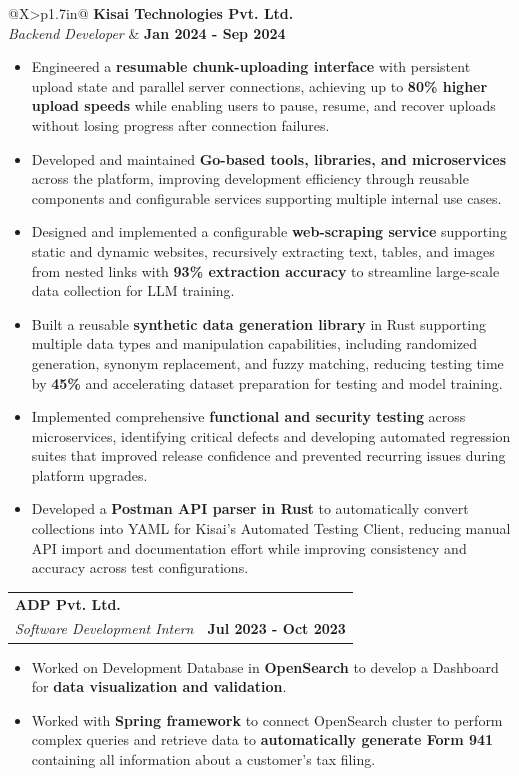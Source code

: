 \documentclass[8pt,a4paper]{article}
\makeatletter
\newcommand{\job}[2]{%
  \vspace{1pt}
  \begin{tabularx}{\linewidth}{@{}X>{\raggedleft\arraybackslash}p{1.7in}@{}}
    #1 & \textbf{#2}
  \end{tabularx}
}
\makeatother
\begin{document}
\job{\textbf{Kisai Technologies Pvt. Ltd.}\\[2pt]\textit{Backend Developer}}{Jan 2024 - Sep 2024}
\begin{itemize}
    \item Engineered a \textbf{resumable chunk-uploading interface} with persistent upload state and parallel server connections, achieving up to \textbf{80\% higher upload speeds} while enabling users to pause, resume, and recover uploads without losing progress after connection failures.
    \item Developed and maintained \textbf{Go-based tools, libraries, and microservices} across the platform, improving development efficiency through reusable components and configurable services supporting multiple internal use cases.
    \item Designed and implemented a configurable \textbf{web-scraping service} supporting static and dynamic websites, recursively extracting text, tables, and images from nested links with \textbf{93\% extraction accuracy} to streamline large-scale data collection for LLM training.
    \item Built a reusable \textbf{synthetic data generation library} in Rust supporting multiple data types and manipulation capabilities, including randomized generation, synonym replacement, and fuzzy matching, reducing testing time by \textbf{45\%} and accelerating dataset preparation for testing and model training.
    \item Implemented comprehensive \textbf{functional and security testing} across microservices, identifying critical defects and developing automated regression suites that improved release confidence and prevented recurring issues during platform upgrades.
    \item Developed a \textbf{Postman API parser in Rust} to automatically convert collections into YAML for Kisai’s Automated Testing Client, reducing manual API import and documentation effort while improving consistency and accuracy across test configurations.
\end{itemize}

\job{\textbf{ADP Pvt. Ltd.}\\[2pt]\textit{Software Development Intern}}{Jul 2023 - Oct 2023}
\begin{itemize}
    \item Worked on Development Database in \textbf{OpenSearch} to develop a Dashboard for \textbf{data visualization and validation}.
    \item Worked with \textbf{Spring framework} to connect OpenSearch cluster to perform complex queries and retrieve data to \textbf{automatically generate Form 941} containing all information about a customer’s tax filing.
\end{itemize}
\end{document}

